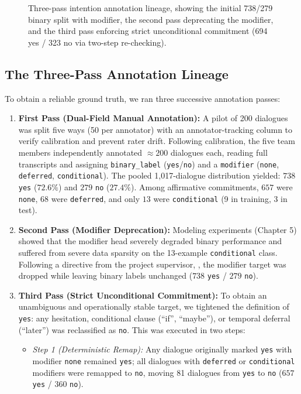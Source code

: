 \begin{figure}[htbp]
  \centering
  \resizebox{\textwidth}{!}{}
  \caption{Three-pass intention annotation lineage, showing the initial 738/279 binary split with modifier, the second pass deprecating the modifier, and the third pass enforcing strict unconditional commitment (694 yes / 323 no via two-step re-checking).}
  \label{fig:intention_annotation_passes}
\end{figure}

\subsection{The Three-Pass Annotation Lineage}
To obtain a reliable ground truth, we ran three successive annotation passes:
\begin{enumerate}
  \item \textbf{First Pass (Dual-Field Manual Annotation):} A pilot of 200 dialogues was split five ways (50 per annotator) with an annotator-tracking column to verify calibration and prevent rater drift. Following calibration, the five team members independently annotated $\approx 200$ dialogues each, reading full transcripts and assigning \texttt{binary\_label} (\texttt{yes}/\texttt{no}) and a \texttt{modifier} (\texttt{none}, \texttt{deferred}, \texttt{conditional}). The pooled 1,017-dialogue distribution yielded: $738$ \texttt{yes} ($72.6\%$) and $279$ \texttt{no} ($27.4\%$). Among affirmative commitments, $657$ were \texttt{none}, $68$ were \texttt{deferred}, and only $13$ were \texttt{conditional} (9 in training, 3 in test).
  \item \textbf{Second Pass (Modifier Deprecation):} Modeling experiments (Chapter 5) showed that the modifier head severely degraded binary performance and suffered from severe data sparsity on the 13-example \texttt{conditional} class. Following a directive from the project supervisor, \SupervisorName, the modifier target was dropped while leaving binary labels unchanged ($738$ \texttt{yes} / $279$ \texttt{no}).
  \item \textbf{Third Pass (Strict Unconditional Commitment):} To obtain an unambiguous and operationally stable target, we tightened the definition of \texttt{yes}: any hesitation, conditional clause (``if'', ``maybe''), or temporal deferral (``later'') was reclassified as \texttt{no}. This was executed in two steps:
    \begin{itemize}
      \item \textit{Step 1 (Deterministic Remap):} Any dialogue originally marked \texttt{yes} with modifier \texttt{none} remained \texttt{yes}; all dialogues with \texttt{deferred} or \texttt{conditional} modifiers were remapped to \texttt{no}, moving 81 dialogues from \texttt{yes} to \texttt{no} ($657$ \texttt{yes} / $360$ \texttt{no}).

\end{itemize}
\end{enumerate}
